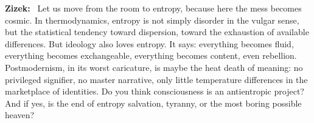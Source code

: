 \documentclass[a4paper,11pt]{article}
\newenvironment{question}{\par\noindent\color{ALIUSRed}\textbf{Zizek:}\ }{\par}
\begin{document}
\begin{question}
Let us move from the room to entropy, because here the mess becomes cosmic. In thermodynamics, entropy is not simply disorder in the vulgar sense, but the statistical tendency toward dispersion, toward the exhaustion of available differences. But ideology also loves entropy. It says: everything becomes fluid, everything becomes exchangeable, everything becomes content, even rebellion. Postmodernism, in its worst caricature, is maybe the heat death of meaning: no privileged signifier, no master narrative, only little temperature differences in the marketplace of identities. Do you think consciousness is an antientropic project? And if yes, is the end of entropy salvation, tyranny, or the most boring possible heaven?
\end{question}
\end{document}
